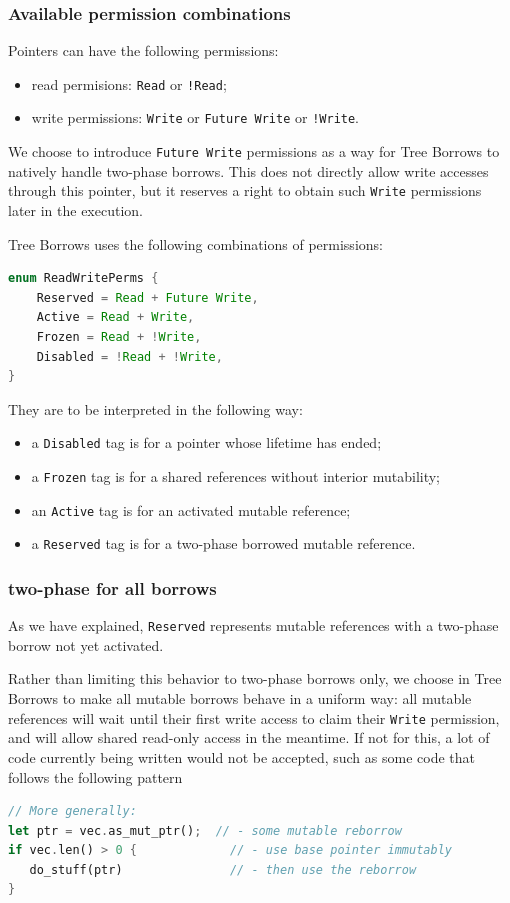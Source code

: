 \documentclass[a4paper,11pt]{article}
\theoremstyle{plain}
\theoremstyle{definition}
\theoremstyle{remark}
\newcommand{\tperm}[1]{\texttt{#1}}
\begin{document}
\subsubsection{Available permission combinations}

Pointers can have the following permissions:
\begin{itemize}
    \item read permisions: \tperm{Read} or \tperm{!Read};
    \item write permissions: \tperm{Write} or \tperm{Future Write} or \tperm{!Write}.
\end{itemize}

We choose to introduce \tperm{Future Write} permissions as a way for Tree Borrows to
natively handle two-phase borrows.
This does not directly allow write accesses through this pointer, but it reserves
a right to obtain such \tperm{Write} permissions later in the execution.

Tree Borrows uses the following combinations of permissions:
\begin{lstlisting}[language=rust]
enum ReadWritePerms {
    Reserved = Read + Future Write,
    Active = Read + Write,
    Frozen = Read + !Write,
    Disabled = !Read + !Write,
}
\end{lstlisting}

They are to be interpreted in the following way:
\begin{itemize}
    \item a \tperm{Disabled} tag is for a pointer whose lifetime has ended;
    \item a \tperm{Frozen} tag is for a shared references without interior mutability;
    \item an \tperm{Active} tag is for an activated mutable reference;
    \item a \tperm{Reserved} tag is for a two-phase borrowed mutable reference.
\end{itemize}

\subsubsection{two-phase for all borrows}

As we have explained, \tperm{Reserved} represents mutable references with
a two-phase borrow not yet activated.

Rather than limiting this behavior to two-phase borrows only, we choose in Tree
Borrows to make all mutable borrows behave in a uniform way: all mutable references
will wait until their first write access to claim their \tperm{Write} permission,
and will allow shared read-only access in the meantime. If not for this, a lot
of code currently being written would not be accepted, such as some code that
follows the following pattern
\begin{lstlisting}[language=rust]
                               // More generally:
let ptr = vec.as_mut_ptr();  // - some mutable reborrow
if vec.len() > 0 {             // - use base pointer immutably
   do_stuff(ptr)               // - then use the reborrow
}
\end{lstlisting}
\end{document}
